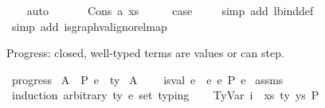 \begin{isabellebody}
\ \ \isamarkupfalse%
\ auto\isanewline
\ \ \isamarkupfalse%
\isanewline
{}\isamarkupfalse%
\isanewline
\ \ \isamarkupfalse%
\ {\isacharparenleft}{\kern0pt}Cons\ a\ xs{\isacharparenright}{\kern0pt}\isanewline
\ \ \isamarkupfalse%
\ \isamarkupfalse%
\ {\isacharquery}{\kern0pt}case\ \isanewline
\ \ \isamarkupfalse%
\ {\isacharparenleft}{\kern0pt}simp\ add{\isacharcolon}{\kern0pt}\ lbind{\isacharunderscore}{\kern0pt}def{\isacharparenright}{\kern0pt}\isanewline
\ \ \isamarkupfalse%
\ {\isacharparenleft}{\kern0pt}simp\ add{\isacharcolon}{\kern0pt}\ is{\isacharunderscore}{\kern0pt}graph{\isacharunderscore}{\kern0pt}val{\isacharunderscore}{\kern0pt}ignore{\isacharunderscore}{\kern0pt}lmap{\isacharparenright}{\kern0pt}\isanewline
{}\isamarkupfalse%
%
\endisatagproof
{\isafoldproof}%
%
\isadelimproof
%
\endisadelimproof
%
\begin{isamarkuptext}%
Progress: closed, well-typed terms are values or can step.%
\end{isamarkuptext}\isamarkuptrue%
\isamarkupfalse%
\ progress{\isacharcolon}{\kern0pt}\isanewline
{}\ A{}{\isacharcolon}{\kern0pt}\ {\isachardoublequoteopen}{\isasymGamma}\ {\isasymturnstile}{\isacharbraceleft}{\kern0pt}P{\isacharbraceright}{\kern0pt}\ e\ {\isacharcolon}{\kern0pt}\ ty{\isachardoublequoteclose}\isanewline
{}\ A{}{\isacharcolon}{\kern0pt}\ {\isachardoublequoteopen}{\isasymGamma}\ {\isacharequal}{\kern0pt}\ {\isacharbrackleft}{\kern0pt}{\isacharbrackright}{\kern0pt}{\isachardoublequoteclose}\isanewline
{}\ {\isachardoublequoteopen}is{\isacharunderscore}{\kern0pt}val\ e\ {\isasymor}\ {\isacharparenleft}{\kern0pt}{\isasymexists}e{\isacharprime}{\kern0pt}{\isachardot}{\kern0pt}\ e\ {\isacharminus}{\kern0pt}{\isachargreater}{\kern0pt}{\isacharbraceleft}{\kern0pt}P{\isacharbraceright}{\kern0pt}\ e{\isacharprime}{\kern0pt}{\isacharparenright}{\kern0pt}{\isachardoublequoteclose}\isanewline
%
\isadelimproof
%
\endisadelimproof
%
\isatagproof
{}\isamarkupfalse%
\ assms\isanewline
{}\isamarkupfalse%
\ {\isacharparenleft}{\kern0pt}induction\ arbitrary{\isacharcolon}{\kern0pt}\ ty\ e{\isacharprime}{\kern0pt}\ set{\isacharcolon}{\kern0pt}\ typing{\isacharparenright}{\kern0pt}\isanewline
\ \ \isamarkupfalse%
\ {\isacharparenleft}{\kern0pt}TyVar\ i\ {\isasymGamma}\ xs\ ty\ ys\ P{\isacharparenright}{\kern0pt}\isanewline

\end{isabellebody}
